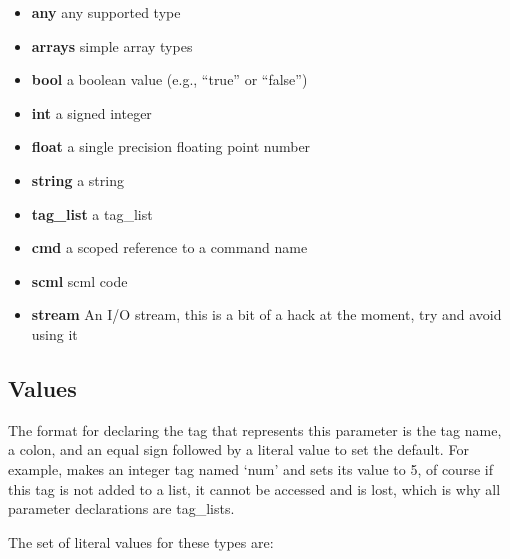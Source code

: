 \begin{itemize}
  \item \textbf{any}
  any supported type

  \item \textbf{arrays}
  simple array types

  \item \textbf{bool}
  a boolean value (e.g., ``true'' or ``false'')

  \item \textbf{int}
  a signed integer

  \item \textbf{float}
  a single precision floating point number

  \item \textbf{string}
  a string

  \item \textbf{tag\_list}
  a tag\_list

  \item \textbf{cmd}
  a scoped reference to a command name

  \item \textbf{scml}
  scml code

  \item \textbf{stream}
  An I/O stream, this is a bit of a hack at the moment, try and avoid using it
\end{itemize}

\subsection{Values}

The format for declaring the tag that represents this parameter is the tag
name, a colon, and an equal sign followed by a literal value to set the
default.  For example,  makes an integer tag named `num'
and sets its value to 5, of course if this tag is not added to a list, it cannot
be accessed and is lost, which is why all parameter declarations are
tag\_lists.

The set of literal values for these types are:

